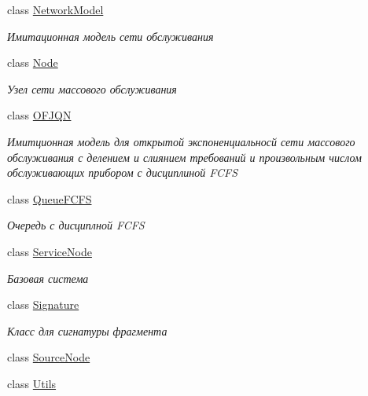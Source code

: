 \begin{DoxyCompactItemize}
class \hyperlink{class_network_simulator_1_1_network_model}{Network\+Model}
\begin{DoxyCompactList}\small\item\em Имитационная модель сети обслуживания \end{DoxyCompactList}\item 
class \hyperlink{class_network_simulator_1_1_node}{Node}
\begin{DoxyCompactList}\small\item\em Узел сети массового обслуживания \end{DoxyCompactList}\item 
class \hyperlink{class_network_simulator_1_1_o_f_j_q_n}{O\+F\+J\+QN}
\begin{DoxyCompactList}\small\item\em Имитционная модель для открытой экспоненциальносй сети массового обслуживания с делением и слиянием требований и произвольным числом обслуживающих прибором с дисциплиной F\+C\+FS \end{DoxyCompactList}\item 
class \hyperlink{class_network_simulator_1_1_queue_f_c_f_s}{Queue\+F\+C\+FS}
\begin{DoxyCompactList}\small\item\em Очередь с дисциплной F\+C\+FS \end{DoxyCompactList}\item 
class \hyperlink{class_network_simulator_1_1_service_node}{Service\+Node}
\begin{DoxyCompactList}\small\item\em Базовая система \end{DoxyCompactList}\item 
class \hyperlink{class_network_simulator_1_1_signature}{Signature}
\begin{DoxyCompactList}\small\item\em Класс для сигнатуры фрагмента \end{DoxyCompactList}\item 
class \hyperlink{class_network_simulator_1_1_source_node}{Source\+Node}
\item 
class \hyperlink{class_network_simulator_1_1_utils}{Utils}
\end{DoxyCompactItemize}
